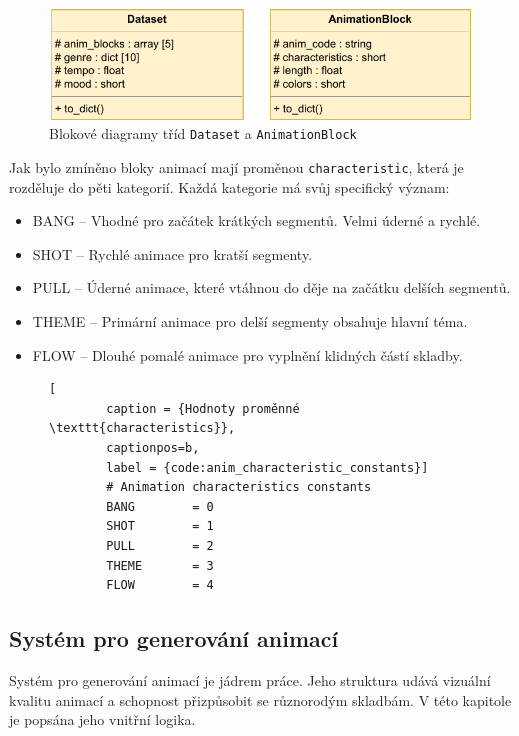 \begin{figure}[H]
    \centering
    \includegraphics[width = 0.7\linewidth]{obrazky/UML_diagram_Dataset_and_AnimationBlock.pdf}
    \caption{Blokové diagramy tříd \texttt{Dataset} a \texttt{AnimationBlock}}
    \label{fig:UML_diagram_Dataset_AnimationBlock}
\end{figure}

Jak bylo zmíněno bloky animací mají proměnou \texttt{characteristic}, která je rozděluje do pěti kategorií. Každá kategorie má svůj specifický význam: 

\begin{itemize}
    \item BANG -- Vhodné pro začátek krátkých segmentů. Velmi úderné a rychlé.
    \item SHOT -- Rychlé animace pro kratší segmenty.
    \item PULL -- Úderné animace, které vtáhnou do děje na začátku delších segmentů.
    \item THEME -- Primární animace pro delší segmenty obsahuje hlavní téma.
    \item FLOW -- Dlouhé pomalé animace pro vyplnění klidných částí skladby.
\end{itemize}

\begin{figure}[H]
    \begin{lstlisting}[
        caption = {Hodnoty proměnné \texttt{characteristics}},
        captionpos=b,
        label = {code:anim_characteristic_constants}]
        # Animation characteristics constants
        BANG        = 0
        SHOT        = 1
        PULL        = 2
        THEME       = 3
        FLOW        = 4
    \end{lstlisting}
\end{figure}

\subsection{Systém pro generování animací} \label{sec:System_generovani_animaci}
Systém pro generování animací je jádrem práce. Jeho struktura udává vizuální kvalitu animací a schopnost přizpůsobit se různorodým skladbám. V této kapitole je popsána jeho vnitřní logika.

